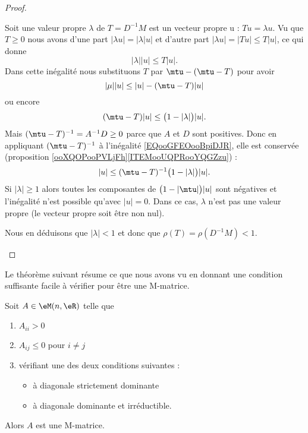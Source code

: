 \begin{proof}
\begin{subproof}
            Soit une valeur propre \( \lambda\) de \( T=D^{-1}M\) est un vecteur propre u : \( Tu=\lambda u\). Vu que \( T\geq 0\) nous avons d'une part \( | \lambda u |=| \lambda | u |\) et d'autre part \( | \lambda u |=| Tu |\leq T| u |\), ce qui donne
            \begin{equation}
                | \lambda | |u |\leq T| u |.
            \end{equation}
            Dans cette inégalité nous substituons \( T\) par \( \mtu-(\mtu-T)\) pour avoir
            \begin{equation}
                | \mu | |u |\leq | u |-(\mtu-T)| u |
            \end{equation}
            ou encore
            \begin{equation}        \label{EQooGFEOooBpiDJR}
                (\mtu-T)| u |\leq \big( 1-| \lambda | \big)| u |.
            \end{equation}
            Mais \( (\mtu-T)^{-1}=A^{-1}D\geq 0\) parce que \( A\) et \( D\) sont positives. Donc en appliquant \( (\mtu-T)^{-1}\) à l'inégalité \eqref{EQooGFEOooBpiDJR}, elle est conservée (proposition \ref{ooXQOPooPVLjFh}\ref{ITEMooUQPRooYQGZzu}) :
            \begin{equation}
                | u |\leq (\mtu-T)^{-1}\big( 1-| \lambda | \big)| u |.
            \end{equation}
            Si \( | \lambda |\geq 1\) alors toutes les composantes de \( \big( 1-| \mtu | \big)| u |\) sont négatives et l'inégalité n'est possible qu'avec \( | u |=0\). Dans ce cas, \( \lambda\) n'est pas une valeur propre (le vecteur propre soit être non nul).

            Nous en déduisons que \( | \lambda |<1\) et donc que \( \rho(T)=\rho(D^{-1}M)<1\).
    \end{subproof}
\end{proof}

Le théorème suivant résume ce que nous avons vu en donnant une condition suffisante facile à vérifier pour être une M-matrice.
\begin{theorem}
    Soit \( A\in \eM(n,\eR)\) telle que
    \begin{enumerate}
        \item
            \( A_{ii}>0\) 
        \item
            \( A_{ij}\leq 0\) pour \( i\neq j\)
        \item
            vérifiant une des deux conditions suivantes :
    \begin{itemize}
        \item à diagonale strictement dominante
        \item à diagonale dominante et irréductible.
    \end{itemize}
    \end{enumerate}
    Alors \( A\) est une M-matrice.
\end{theorem}

